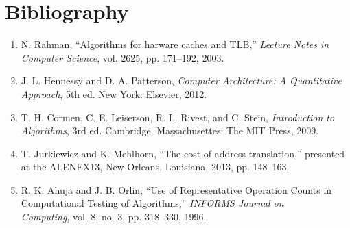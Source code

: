 \section{Bibliography}
  \begin{enumerate}
    \item N. Rahman, “Algorithms for harware caches and TLB,” \textit{Lecture
    Notes in Computer Science}, vol. 2625, pp. 171–192, 2003.
    
    \item  J. L. Hennessy and D. A. Patterson, \textit{Computer Architecture: A
    Quantitative Approach}, 5th ed. New York: Elsevier, 2012.
    
    \item T. H. Cormen, C. E. Leiserson, R. L. Rivest, and C. Stein,
    \textit{Introduction to Algorithms}, 3rd ed. Cambridge, Massachusettes: The
    MIT Press, 2009.
    
    \item T. Jurkiewicz and K. Mehlhorn, “The cost of address
    translation,” presented at the ALENEX13, New Orleans, Louisiana, 2013, pp.
    148–163.
   
   \item R. K. Ahuja and J. B. Orlin, “Use of Representative Operation Counts
   in Computational Testing of Algorithms,” 
   \textit{INFORMS Journal on\\Computing}, vol. 8, no. 3, pp. 318–330, 1996.
   
  \end{enumerate}